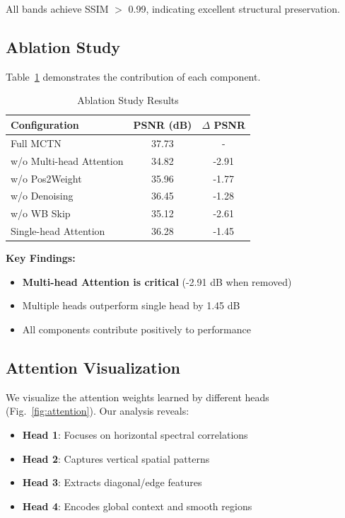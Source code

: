 \documentclass[conference]{IEEEtran}
\begin{document}
All bands achieve SSIM $>$ 0.99, indicating excellent structural preservation.

\subsection{Ablation Study}

Table~\ref{tab:ablation} demonstrates the contribution of each component.

\begin{table}[htbp]
\caption{Ablation Study Results}
\label{tab:ablation}
\centering
\begin{tabular}{lcc}
\toprule
\textbf{Configuration} & \textbf{PSNR (dB)} & \textbf{$\Delta$ PSNR} \\
\midrule
Full MCTN & 37.73 & - \\
\midrule
w/o Multi-head Attention & 34.82 & -2.91 \\
w/o Pos2Weight & 35.96 & -1.77 \\
w/o Denoising & 36.45 & -1.28 \\
w/o WB Skip & 35.12 & -2.61 \\
Single-head Attention & 36.28 & -1.45 \\
\bottomrule
\end{tabular}
\label{tab:ablation}
\end{table}

\textbf{Key Findings:}
\begin{itemize}
    \item \textbf{Multi-head Attention is critical} (-2.91 dB when removed)
    \item Multiple heads outperform single head by 1.45 dB
    \item All components contribute positively to performance
\end{itemize}

\subsection{Attention Visualization}

We visualize the attention weights learned by different heads (Fig.~\ref{fig:attention}). Our analysis reveals:

\begin{itemize}
    \item \textbf{Head 1}: Focuses on horizontal spectral correlations
    \item \textbf{Head 2}: Captures vertical spatial patterns
    \item \textbf{Head 3}: Extracts diagonal/edge features
    \item \textbf{Head 4}: Encodes global context and smooth regions
\end{itemize}
\end{document}
